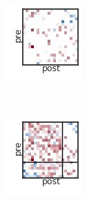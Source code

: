 \begin{figure}[t!]
\begin{subfigure}[b]{1.25in}
  \end{subfigure}
  ~
  \hspace{-.1in}
  \begin{subfigure}[b]{1.10in}
    \centering
    \includegraphics[width=\textwidth]{figures/ch3/Bernoulli-Distance.png}
  \end{subfigure}
  ~
  \hspace{-.1in}
  \begin{subfigure}[b]{1.10in}
    \centering
    \includegraphics[width=\textwidth]{figures/ch3/SBM-Distance.png}

\end{subfigure}
\end{figure}
